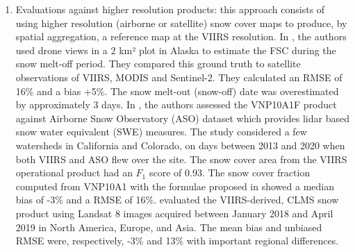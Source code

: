 \documentclass[tc, manuscript]{copernicus}
\begin{document}
\begin{enumerate}
    \item Evaluations against higher resolution products: this approach consists of using higher resolution (airborne or satellite) snow cover maps to produce, by spatial aggregation, a reference map at the VIIRS resolution. In \citep{jacques-hamilton_measurement_2025}, the authors used drone views in a 2 km² plot in Alaska to estimate the FSC during the snow melt-off period. They compared this ground truth to satellite observations of VIIRS, MODIS and Sentinel-2.  They calculated an RMSE of 16\% and a bias +5\%. The snow melt-out (snow-off) date was overestimated by approximately 3 days. 
    In \citep{stillinger_landsat_2023}, the authors assessed the VNP10A1F product against Airborne Snow Observatory (ASO) dataset \citep{painter2016AirborneSnowObservatory} which provides lidar based snow water equivalent (SWE) measures. The study considered a few watersheds in California and Colorado, on days between 2013 and 2020 when both VIIRS and ASO flew over the site. The snow cover area from the VIIRS operational product had an $F_1$ score of 0.93. The snow cover fraction computed from VNP10A1 with the formulae proposed in \citep{salomonson_development_2006} showed a median bias of -3\% and a RMSE of 16\%. 
    \citep{schwaizer2020SnowCoverExtentb} evaluated the VIIRS-derived, CLMS snow product using Landsat 8 images acquired between January 2018 and April 2019 in North America, Europe, and Asia. The mean bias and unbiased RMSE were, respectively, -3\% and 13\% with important regional differences. 

\end{enumerate}
\end{document}
